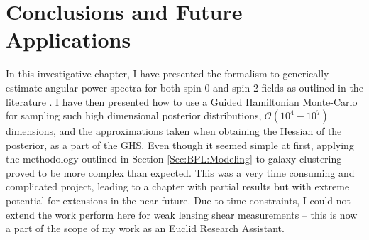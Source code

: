 

\section{Conclusions and Future Applications}
In this investigative chapter, I have presented the formalism to generically estimate angular power spectra for both spin-0 and spin-2 fields as outlined in the literature \citep{Borrill1999, Hobson2002, Taylor2008,SreeThesis}. I have then presented how to use a Guided Hamiltonian Monte-Carlo for sampling such high dimensional posterior distributions, $\mathcal{O}(10^{4}-10^{7})$ dimensions, and the approximations taken when obtaining the Hessian of the posterior, as a part of the GHS. Even though it seemed simple at first, applying the methodology outlined in Section \ref{Sec:BPL:Modeling} to galaxy clustering proved to be more complex than expected. This was a very time consuming and complicated project, leading to a chapter with partial results but with extreme potential for extensions in the near future. Due to time constraints, I could not extend the work perform here for weak lensing shear measurements -- this is now a part of the scope of my work as an Euclid Research Assistant. 

